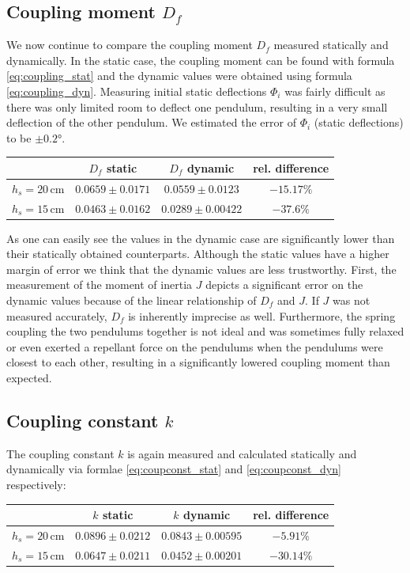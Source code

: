 \documentclass{scrreprt}
\newcommand{\unit}[1]{\ensuremath{\, \mathrm{#1}}}
\begin{document}
\subsection{Coupling moment $D_f$}
We now continue to compare the coupling moment $D_f$ measured statically and dynamically. In the static case, the coupling moment can be found with formula \ref{eq:coupling_stat} and the dynamic values were obtained using formula \ref{eq:coupling_dyn}. Measuring initial static deflections $\Phi_i$ was fairly difficult as there was only limited room to deflect one pendulum, resulting in a very small deflection of the other pendulum. We estimated the error of $\Phi_i$ (static deflections) to be $\pm \ang{0.2}$.

\begin{table}[H]
\center
\begin{tabular}{cccc}
 & $D_f$ static & $D_f$ dynamic & rel. difference\\
\hline
$h_s = 20 \unit{cm}$ & $0.0659 \pm 0.0171$ & $0.0559 \pm 0.0123$ & $-15.17\%$\\
$h_s = 15 \unit{cm}$ & $0.0463 \pm 0.0162$ & $0.0289 \pm 0.00422$ & $-37.6\%$\\
 
\end{tabular}
\end{table} 

As one can easily see the values in the dynamic case are significantly lower than their statically obtained counterparts. Although the static values have a higher margin of error we think that the dynamic values are less trustworthy. First, the measurement of the moment of inertia $J$ depicts a significant error on the dynamic values because of the linear relationship of $D_f$ and $J$. If $J$ was not measured accurately, $D_f$ is inherently imprecise as well. Furthermore, the spring coupling the two pendulums together is not ideal and was sometimes fully relaxed or even exerted a repellant force on the pendulums when the pendulums were closest to each other, resulting in a significantly lowered coupling moment than expected.

\subsection{Coupling constant $k$}
The coupling constant $k$ is again measured and calculated statically and dynamically via formlae \ref{eq:coupconst_stat} and \ref{eq:coupconst_dyn} respectively:

\begin{table}[H]
\center
\begin{tabular}{cccc}
 & $k$ static & $k$ dynamic & rel. difference\\
\hline
$h_s = 20 \unit{cm}$ & $0.0896 \pm 0.0212$ & $0.0843 \pm 0.00595$ & $-5.91\%$\\
$h_s = 15 \unit{cm}$ & $0.0647 \pm 0.0211$ & $0.0452 \pm 0.00201$ & $-30.14\%$\\
 
\end{tabular}
\end{table} 
\end{document}
